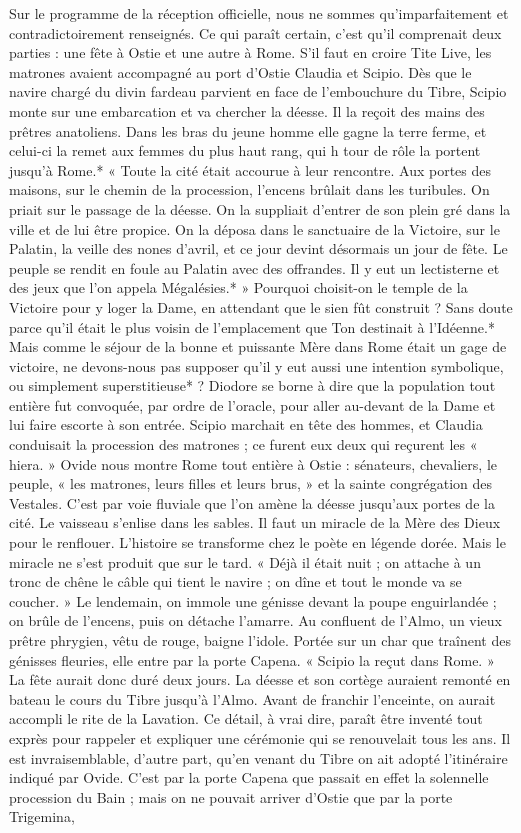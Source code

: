 \documentclass[a4paper, 11pt, oneside, polutonikogreek, french]{article}
\begin{document}
Sur le programme de la réception officielle, nous ne sommes qu'imparfaitement et contradictoirement renseignés. Ce qui paraît certain, c'est qu'il comprenait deux parties : une fête à Ostie et une autre à Rome. S'il faut en croire Tite Live, les matrones avaient accompagné au port d'Ostie Claudia et Scipio. Dès que le navire chargé du divin fardeau parvient en face de l'embouchure du Tibre, Scipio monte sur une embarcation et va chercher la déesse. Il la reçoit des mains des prêtres anatoliens. Dans les bras du jeune homme elle gagne la terre ferme, et celui-ci la remet aux femmes du plus haut rang, qui h tour de rôle la portent jusqu'à Rome.* « Toute la cité était accourue à leur rencontre. Aux portes des maisons, sur le chemin de la procession, l'encens brûlait dans les turibules. On priait sur le passage de la déesse. On la suppliait d'entrer de son plein gré dans la ville et de lui être propice. On la déposa dans le sanctuaire de la Victoire, sur le Palatin, la veille des nones d'avril, et ce jour devint désormais un jour de fête. Le peuple se rendit en foule au Palatin avec des offrandes. Il y eut un lectisterne et des jeux que l'on appela Mégalésies.* » Pourquoi choisit-on le temple de la Victoire pour y loger la Dame, en attendant que le sien fût construit ? Sans doute parce qu'il était le plus voisin de l'emplacement que Ton destinait à l'Idéenne.* Mais comme le séjour de la bonne et puissante Mère dans Rome était un gage de victoire, ne devons-nous pas supposer qu'il y eut aussi une intention symbolique, ou simplement superstitieuse* ? Diodore se borne à dire que la population tout entière fut convoquée, par ordre de l'oracle, pour aller au-devant de la Dame et lui faire escorte à son entrée. Scipio marchait en tête des hommes, et Claudia conduisait la procession des matrones ; ce furent eux deux qui reçurent les « hiera. » Ovide nous montre Rome tout entière à Ostie : sénateurs, chevaliers, le peuple, « les matrones, leurs filles et leurs brus, » et la sainte congrégation des Vestales. C'est par voie fluviale que l'on amène la déesse jusqu'aux portes de la cité. Le vaisseau s'enlise dans les sables. Il faut un miracle de la Mère des Dieux pour le renflouer. L'histoire se transforme chez le poète en légende dorée. Mais le miracle ne s'est produit que sur le tard. « Déjà il était nuit ; on attache à un tronc de chêne le câble qui tient le navire ; on dîne et tout le monde va se coucher. » Le lendemain, on immole une génisse devant la poupe enguirlandée ; on brûle de l'encens, puis on détache l'amarre. Au confluent de l'Almo, un vieux prêtre phrygien, vêtu de rouge, baigne l'idole. Portée sur un char que traînent des génisses fleuries, elle entre par la porte Capena. « Scipio la reçut dans Rome. » La fête aurait donc duré deux jours. La déesse et son cortège auraient remonté en bateau le cours du Tibre jusqu'à l'Almo. Avant de franchir l'enceinte, on aurait accompli le rite de la Lavation. Ce détail, à vrai dire, paraît être inventé tout exprès pour rappeler et expliquer une cérémonie qui se renouvelait tous les ans. Il est invraisemblable, d'autre part, qu'en venant du Tibre on ait adopté l'itinéraire indiqué par Ovide. C'est par la porte Capena que passait en effet la solennelle procession du Bain ; mais on ne pouvait arriver d'Ostie que par la porte Trigemina, 
\end{document}
